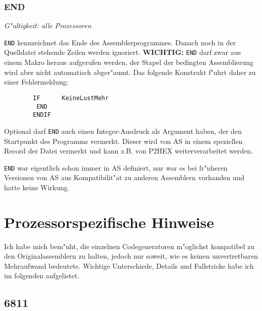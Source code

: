 \documentclass[12pt,a4paper,twoside]{report}
\makeatletter
\newcommand{\bb}[1]{{\bf #1}}
\newcommand{\tty}[1]{{\tt #1}}
\newcommand{\ttindex}[1]{\index{#1@{\tt #1}}}
\makeatother
\begin{document}

\subsection{END}
\ttindex{END}

{\em G"ultigkeit: alle Prozessoren}

\tty{END} kennzeichnet das Ende des Assemblerprogrammes.  Danach
noch in der Quelldatei stehende Zeilen werden ignoriert.
\bb{WICHTIG:} \tty{END} darf zwar aus einem Makro heraus aufgerufen
werden, der Stapel der bedingten Assemblierung wird aber nicht
automatisch abger"aumt.  Das folgende Konstrukt f"uhrt daher zu
einer Fehlermeldung:
\begin{verbatim}
        IF      KeineLustMehr
         END
        ENDIF
\end{verbatim}
Optional darf \tty{END} auch einen Integer-Ausdruck als Argument haben,
der den Startpunkt des Programms vermerkt.  Dieser wird von AS in einem
speziellen Record der Datei vermerkt und kann z.B. von P2HEX
weiterverarbeitet werden.
\par
\tty{END} war eigentlich schon immer in AS definiert, nur war es
bei fr"uheren Versionen von AS aus Kompatibilit"at zu anderen
Assemblern vorhanden und hatte keine Wirkung.


\cleardoublepage
\chapter{Prozessorspezifische Hinweise}

Ich habe mich bem"uht, die einzelnen Codegeneratoren m"oglichst kompatibel
zu den Originalassemblern zu halten, jedoch nur soweit, wie es keinen
unvertretbaren Mehraufwand bedeutete.  Wichtige Unterschiede, Details und
Fallstricke habe ich im folgenden aufgelistet.


\section{6811}
\end{document}
